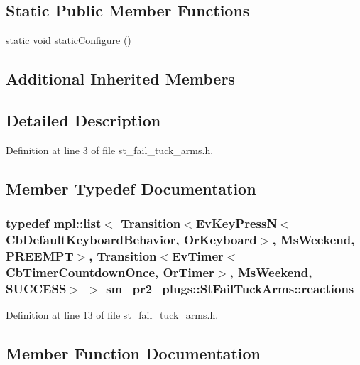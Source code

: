 \subsection*{Static Public Member Functions}
\begin{DoxyCompactItemize}
\item 
static void \hyperlink{structsm__pr2__plugs_1_1StFailTuckArms_ac23b79659008da8001dfe46ce7e0e8b7}{static\+Configure} ()
\end{DoxyCompactItemize}
\subsection*{Additional Inherited Members}


\subsection{Detailed Description}


Definition at line 3 of file st\+\_\+fail\+\_\+tuck\+\_\+arms.\+h.



\subsection{Member Typedef Documentation}
\subsubsection[{\texorpdfstring{reactions}{reactions}}]{\setlength{\rightskip}{0pt plus 5cm}typedef mpl\+::list$<$ Transition$<$Ev\+Key\+PressN$<$Cb\+Default\+Keyboard\+Behavior, {\bf Or\+Keyboard}$>$, {\bf Ms\+Weekend}, {\bf P\+R\+E\+E\+M\+PT}$>$, Transition$<$Ev\+Timer$<$Cb\+Timer\+Countdown\+Once, {\bf Or\+Timer}$>$, {\bf Ms\+Weekend}, {\bf S\+U\+C\+C\+E\+SS}$>$ $>$ {\bf sm\+\_\+pr2\+\_\+plugs\+::\+St\+Fail\+Tuck\+Arms\+::reactions}}\hypertarget{structsm__pr2__plugs_1_1StFailTuckArms_aa275c126da6dae03665a112f335c98fb}{}\label{structsm__pr2__plugs_1_1StFailTuckArms_aa275c126da6dae03665a112f335c98fb}


Definition at line 13 of file st\+\_\+fail\+\_\+tuck\+\_\+arms.\+h.



\subsection{Member Function Documentation}
